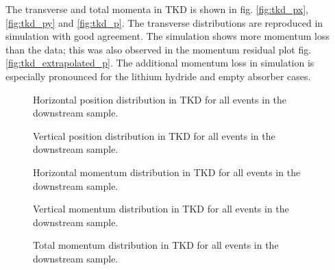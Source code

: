 The transverse and total momenta in TKD is shown in fig. \ref{fig:tkd_px},
\ref{fig:tkd_py} and \ref{fig:tkd_p}. The transverse distributions are reproduced
in simulation with good agreement. The simulation shows more momentum loss than
the data; this was also observed in the momentum residual plot fig.
\ref{fig:tkd_extrapolated_p}. The additional momentum loss in simulation is
especially pronounced for the lithium hydride and empty absorber cases.


\begin{figure}[!tbh]
    \centering
    {Horizontal position distribution in TKD for all events in the downstream sample.}
\end{figure}

\begin{figure}[!tbh]
    \centering
    {Vertical position distribution in TKD for all events in the downstream sample.}
\end{figure}

\begin{figure}[!tbh]
    \centering
    {Horizontal momentum distribution in TKD for all events in the downstream sample.}
\end{figure}

\begin{figure}[!tbh]
    \centering
    {Vertical momentum distribution in TKD for all events in the downstream sample.}
\end{figure}

\begin{figure}[!tbh]
    \centering
    {Total momentum distribution in TKD for all events in the downstream sample.}
\end{figure}


